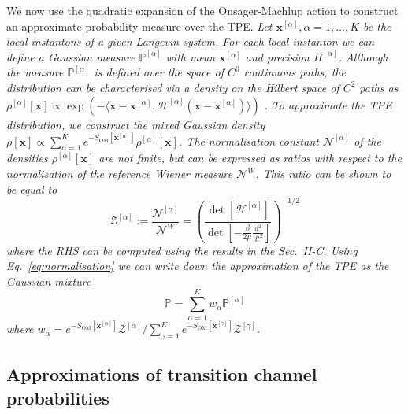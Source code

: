 We now use the quadratic expansion of the Onsager-Machlup action to
construct an approximate probability measure over the TPE. \textit{\emph{Let
$\mathbf{x}^{[\alpha]},\alpha=1,\dots,K$ be the local instantons
of a given Langevin system. For each local instanton we can define
a Gaussian measure $\mathbb{P}^{[\alpha]}$ with mean $\mathbf{x}^{[\alpha]}$
and precision $H^{[\alpha]}$. Although the measure $\mathbb{P}^{[\alpha]}$
is defined over the space of $C^{0}$ continuous paths, the distribution
can be characterised via a density on the Hilbert space of $C^{2}$
paths as $\rho^{[\alpha]}[\mathbf{x}]\propto\exp(-\langle\mathbf{x}-\mathbf{x}^{[\alpha]},\mathcal{H}^{[\alpha]}(\mathbf{x}-\mathbf{x}^{[\alpha]})\rangle)$
}}\citep{grossAbstractWienerSpaces1967,FunctionalIntegrationBasics}\textit{\emph{.
To approximate the TPE distribution, we construct the mixed Gaussian
density $\bar{\rho}[\mathbf{x}]\propto\sum_{\alpha=1}^{K}e^{-S_{\text{OM}}[\mathbf{x}^{[\alpha]}]}\rho^{[\alpha]}[\mathbf{x}]$.
The normalisation constant $\mathcal{N}^{[\alpha]}$ of the densities
$\rho^{[\alpha]}[\mathbf{x}]$ are not finite, but can be expressed
as ratios with respect to the normalisation of the reference Wiener
measure $\mathcal{N}^{W}$. This ratio can be shown to be equal to
\citep{levitTheoremInfiniteProducts1977,dunneFunctionalDeterminantsQuantum2008}
\begin{equation}
\mathcal{Z}^{[\alpha]}:=\frac{\mathcal{N}^{[\alpha]}}{\mathcal{N}^{W}}=\left(\frac{\det[\mathcal{H}^{[\alpha]}]}{\det[-\frac{\beta}{2\mu}\frac{d^{2}}{dt^{2}}]}\right)^{-1/2}\label{eq:normalisation}
\end{equation}
where the RHS can be computed using the results in the Sec.}}~\textit{\emph{II-C.
Using Eq.}}~\textit{\emph{\eqref{eq:normalisation} we can write
down the approximation of the TPE as the Gaussian mixture \citep{gelmanBayesianDataAnalysis}
\begin{equation}
\mathbb{\bar{P}}=\sum_{\alpha=1}^{K}w_{\alpha}\mathbb{P}^{[\alpha]}\label{eq:TPE approximation}
\end{equation}
where $w_{\alpha}=e^{-S_{\text{OM}}[\mathbf{x}^{[\alpha]}]}\mathcal{Z}^{[\alpha]}/\sum_{\gamma=1}^{K}e^{-S_{\text{OM}}[\mathbf{x}^{[\gamma]}]}\mathcal{Z}^{[\gamma]}$.}}

\subsection{Approximations of transition channel probabilities}

